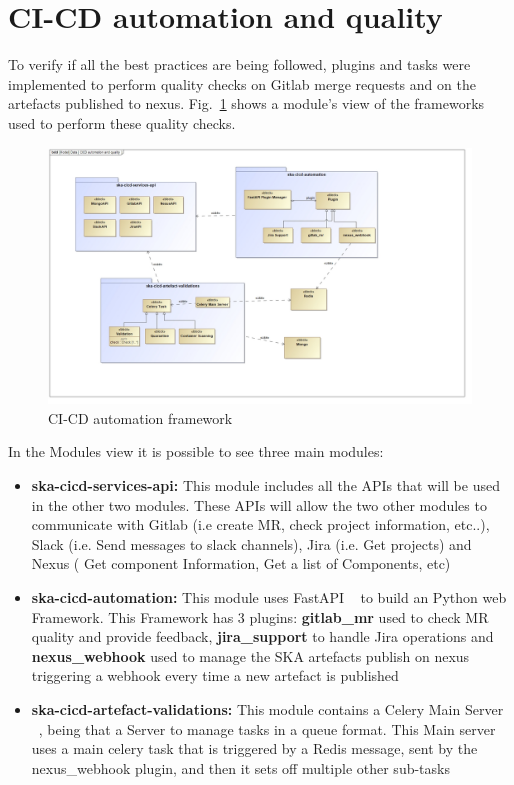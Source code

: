\documentclass[a4paper,
               keeplastbox,   %
               ]{jacow}
\begin{document}
\section{CI-CD automation and quality}


To verify if all the best practices are being followed, plugins and tasks were implemented to perform quality checks on Gitlab merge requests and on the artefacts published to nexus. Fig.~\ref{fig:CICD-automation-quality} shows a module’s view of the frameworks used to perform these quality checks. 

\begin{figure}[!htb]
    \centering
    \includegraphics*[width=0.8\columnwidth]{CICD-automation-quality}
    \caption{CI-CD automation framework}
    \label{fig:CICD-automation-quality}
 \end{figure}
 
 In the Modules view it is possible to see three main modules:
 
 \begin{itemize}
    \item \textbf{ska-cicd-services-api:} This module includes all the APIs that will be used in the other two modules. These APIs will allow the two other modules to communicate with Gitlab (i.e create MR, check project information, etc..), Slack (i.e. Send messages to slack channels), Jira (i.e. Get projects) and Nexus ( Get component Information, Get a list of Components, etc)
    \item \textbf{ska-cicd-automation:} This module uses FastAPI ~\cite{fastapi} to build an Python web Framework. This Framework has 3 plugins: \textbf{gitlab\_mr} used to check MR quality and provide feedback, \textbf{jira\_support} to handle Jira operations and \textbf{nexus\_webhook} used to manage the SKA artefacts publish on nexus triggering a webhook every time a new artefact is published
    \item \textbf{ska-cicd-artefact-validations:} This module contains a Celery Main Server ~\cite{celery}, being that a Server to manage tasks in a queue format. This Main server uses a main celery task that is triggered by a Redis message, sent by the nexus\_webhook plugin, and then it sets off multiple other sub-tasks
 \end{itemize}
 
\end{document}
